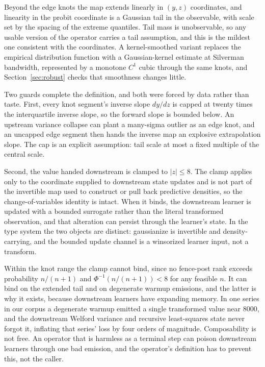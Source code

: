 \documentclass[11pt]{article}
\theoremstyle{remark}
\begin{document}
Beyond the edge knots the map
extends linearly in $(y, z)$ coordinates, and linearity in the probit coordinate is a
Gaussian tail in the observable, with scale set by the spacing of the extreme quantiles.
Tail mass is unobservable, so any usable version of the operator carries a tail assumption,
and this is the mildest one consistent with the coordinates. A kernel-smoothed variant
replaces the empirical distribution function with a Gaussian-kernel estimate at Silverman
bandwidth, represented by a monotone $C^1$ cubic through the same knots, and Section~\ref{sec:robust}
checks that smoothness changes little.

Two guards complete the definition, and both were forced by data rather than taste. First,
every knot segment's inverse slope $dy/dz$ is capped at twenty times the
interquartile inverse slope, so the forward slope is bounded below. An upstream
variance collapse can plant a many-sigma outlier as an edge knot, and an uncapped edge
segment then hands the inverse map an explosive extrapolation slope. The cap is an explicit
assumption: tail scale at most a fixed multiple of the central scale.

Second, the value handed downstream is clamped to $|z| \le 8$. The clamp applies
only to the coordinate supplied to downstream state updates and is not part of the
invertible map used to construct or pull back predictive densities, so the
change-of-variables identity is intact. When it binds, the downstream learner is updated
with a bounded surrogate rather than the literal transformed observation, and that
alteration can persist through the learner's state. In the type system the two objects
are distinct: gaussianize is invertible and density-carrying, and the bounded update
channel is a winsorized learner input, not a transform.

Within the knot range the clamp cannot bind, since no
fence-post rank exceeds probability $n/(n+1)$ and $\Phi^{-1}(n/(n+1)) < 8$ for any
feasible $n$. It can bind on the extended tail and on degenerate warmup emissions, and
the latter is why it exists, because downstream learners have expanding memory. In one series in our corpus a degenerate warmup emitted a single
transformed value near $8000$, and the downstream Welford variance and recursive
least-squares state never forgot it, inflating that series' loss by four orders of
magnitude. Composability is not free. An operator that is harmless as a terminal step can
poison downstream learners through one bad emission, and the operator's definition has to
prevent this, not the caller.
\end{document}
